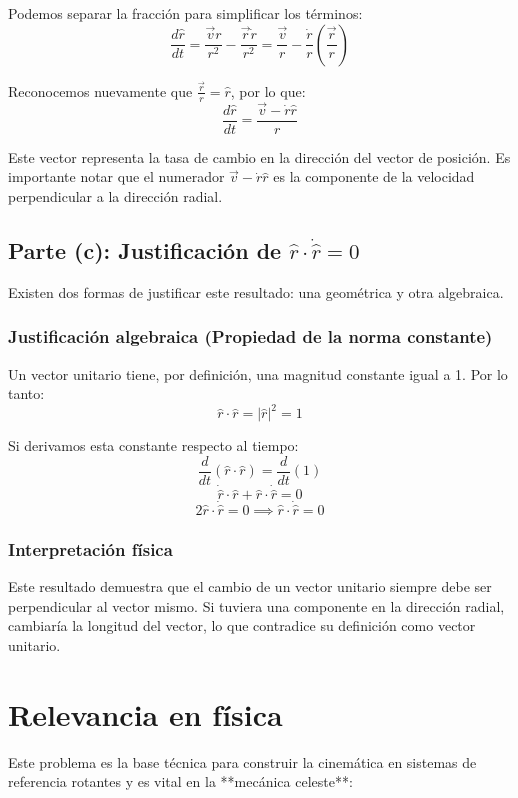 \documentclass[a4paper]{article}
\begin{document}
Podemos separar la fracción para simplificar los términos:
$$ \frac{d\hat{r}}{dt} = \frac{\vec{v}r}{r^2} - \frac{\vec{r}\dot{r}}{r^2} = \frac{\vec{v}}{r} - \frac{\dot{r}}{r} \left( \frac{\vec{r}}{r} \right) $$

Reconocemos nuevamente que $\frac{\vec{r}}{r} = \hat{r}$, por lo que:
$$ \frac{d\hat{r}}{dt} = \frac{\vec{v} - \dot{r}\hat{r}}{r} $$

Este vector representa la tasa de cambio en la dirección del vector de posición. Es importante notar que el numerador $\vec{v} - \dot{r}\hat{r}$ es la componente de la velocidad perpendicular a la dirección radial.

\subsection{Parte (c): Justificación de $\hat{r} \cdot \dot{\hat{r}} = 0$}

Existen dos formas de justificar este resultado: una geométrica y otra algebraica.

\subsubsection{Justificación algebraica (Propiedad de la norma constante)}
Un vector unitario tiene, por definición, una magnitud constante igual a 1. Por lo tanto:
$$ \hat{r} \cdot \hat{r} = |\hat{r}|^2 = 1 $$

Si derivamos esta constante respecto al tiempo:
$$ \frac{d}{dt}(\hat{r} \cdot \hat{r}) = \frac{d}{dt}(1) $$
$$ \dot{\hat{r}} \cdot \hat{r} + \hat{r} \cdot \dot{\hat{r}} = 0 $$
$$ 2\hat{r} \cdot \dot{\hat{r}} = 0 \implies \hat{r} \cdot \dot{\hat{r}} = 0 $$

\subsubsection{Interpretación física}
Este resultado demuestra que el cambio de un vector unitario siempre debe ser perpendicular al vector mismo. Si tuviera una componente en la dirección radial, cambiaría la longitud del vector, lo que contradice su definición como vector unitario.

\section*{Relevancia en física}

Este problema es la base técnica para construir la cinemática en sistemas de referencia rotantes y es vital en la **mecánica celeste**:
\end{document}
